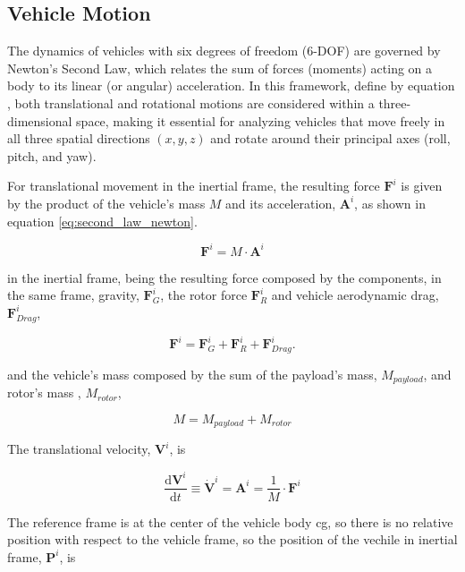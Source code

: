\subsection{Vehicle Motion}
\label{section:Vehicle_Motion}


The dynamics of vehicles with six degrees of freedom (6-DOF) are governed by Newton's Second Law, which relates the sum of forces (moments) acting on a body to its linear (or angular) acceleration. In this framework, define by equation \cite{cook_flight_2007}, both translational and rotational motions are considered within a three-dimensional space, making it essential for analyzing vehicles that move freely in all three spatial directions $(x, y, z)$ and rotate around their principal axes (roll, pitch, and yaw). 

For translational movement in the inertial frame, the resulting force $\mathbf{F}^i$ is given by the product of the vehicle's mass $M$ and its acceleration, $\mathbf{A}^i$, as shown in equation \ref{eq:second_law_newton}. 

\begin{equation}
    \mathbf{F}^i  = M \cdot \mathbf{A}^i
    \label{eq:second_law_newton}
\end{equation}

in the inertial frame, being the resulting force composed by the components, in the same frame, gravity, $\mathbf{F}_G^i$, the rotor force $\mathbf{F}_R^i$ and vehicle aerodynamic drag, $\mathbf{F}_{Drag}^i$,

\begin{equation}
    \mathbf{F}^i = \mathbf{F}_G^i + \mathbf{F}_R^i + \mathbf{F}_{Drag}^i.
\end{equation}

and the vehicle's mass composed by the sum of the payload's mass, $M_{payload}$, and rotor's mass , $M_{rotor}$,

\begin{equation}
    M = M_{payload} + M_{rotor}
\end{equation}


The translational velocity, $\mathbf{V}^i$,  is 

\begin{equation}
    \frac{\mathrm{d}\mathbf{V}^i}{\mathrm{d}t}\equiv  \dot{\mathbf{V}}^i = \mathbf{A}^i = \frac{1}{M} \cdot \mathbf{F}^i
\end{equation}

The reference frame is at the center of the vehicle body \gls{cg}, so there is no relative position with respect to the vehicle frame, so the position of the vechile in inertial frame, $\mathbf{P}^i$, is

